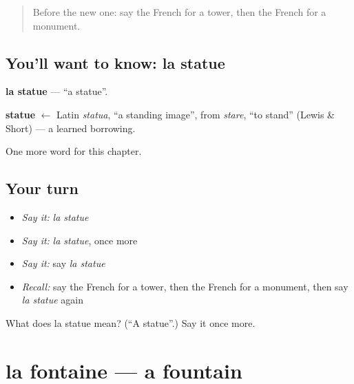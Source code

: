 \label{lesson:FR-C170-statue}



\begin{quote}
Before the new one: say the French for a tower, then the French for a monument.
\end{quote}

\subsection*{You'll want to know: la statue}
\textbf{la statue} — \textquotedblleft{}a statue\textquotedblright{}.

\begin{cousinweb}
\textbf{statue} $\leftarrow$ Latin \emph{statua}, \textquotedblleft{}a standing image\textquotedblright{}, from \emph{stare}, \textquotedblleft{}to stand\textquotedblright{} (Lewis \& Short) — a learned borrowing.
\end{cousinweb}

\begin{grammarlens}[title={What you've built}]
One more word for this chapter.
\end{grammarlens}

\subsection*{Your turn}
\begin{itemize}
\raggedright
  \item \emph{Say it:} \emph{la statue}
  \item \emph{Say it:} \emph{la statue}, once more
  \item \emph{Say it:} say \emph{la statue}
  \item \emph{Recall:} say the French for a tower, then the French for a monument, then say \emph{la statue} again
\end{itemize}

\begin{tcolorbox}[breakable,colback=teal!4,colframe=teal!35!black,title={Before you move on}]
What does la statue mean? (\textquotedblleft{}A statue\textquotedblright{}.) Say it once more.
\end{tcolorbox}
\section[la fontaine]{la fontaine — a fountain}

\label{lesson:FR-C170-fontaine}



